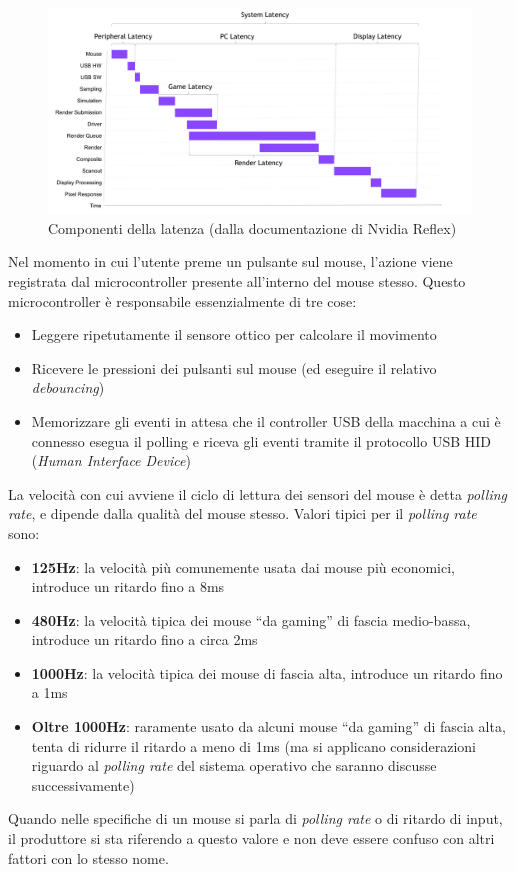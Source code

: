 \begin{figure}[h]
	\centering
	\includegraphics[width=\textwidth]{Introduzione_files/nvidia_latencypipeline.png}
	\caption{Componenti della latenza (dalla documentazione di Nvidia Reflex)}
	\label{fig:nvidia_latencypipeline}
\end{figure}

Nel momento in cui l'utente preme un pulsante sul mouse, l'azione viene registrata dal microcontroller presente all'interno del mouse stesso. Questo microcontroller è responsabile essenzialmente di tre cose:\begin{itemize}
	\item Leggere ripetutamente il sensore ottico per calcolare il movimento
	\item Ricevere le pressioni dei pulsanti sul mouse (ed eseguire il relativo \textit{debouncing})
	\item Memorizzare gli eventi in attesa che il controller USB della macchina a cui è connesso esegua il polling e riceva gli eventi tramite il protocollo USB HID (\textit{Human Interface Device})
\end{itemize}
La velocità con cui avviene il ciclo di lettura dei sensori del mouse è detta \textit{polling rate}, e dipende dalla qualità del mouse stesso. Valori tipici per il \textit{polling rate} sono:
\begin{itemize}
	\item \textbf{125Hz}: la velocità più comunemente usata dai mouse più economici, introduce un ritardo fino a 8ms
	\item \textbf{480Hz}: la velocità tipica dei mouse ``da gaming'' di fascia medio-bassa, introduce un ritardo fino a circa 2ms
	\item \textbf{1000Hz}: la velocità tipica dei mouse di fascia alta, introduce un ritardo fino a 1ms
	\item \textbf{Oltre 1000Hz}: raramente usato da alcuni mouse ``da gaming'' di fascia alta, tenta di ridurre il ritardo a meno di 1ms (ma si applicano considerazioni riguardo al \textit{polling rate} del sistema operativo che saranno discusse successivamente)
\end{itemize}
Quando nelle specifiche di un mouse si parla di \textit{polling rate} o di ritardo di input, il produttore si sta riferendo a questo valore e non deve essere confuso con altri fattori con lo stesso nome.

